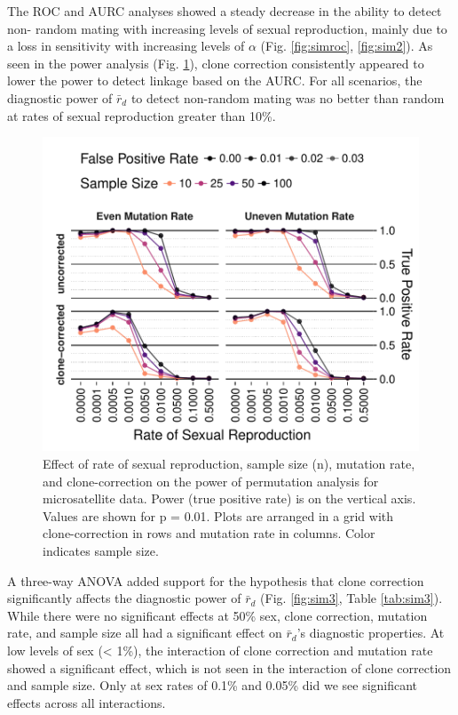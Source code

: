 \documentclass[]{article}
\theoremstyle{definition}
\theoremstyle{definition}
\theoremstyle{definition}
\theoremstyle{remark}
\begin{document}
The ROC and AURC analyses showed a steady decrease in the ability to
detect non- random mating with increasing levels of sexual reproduction,
mainly due to a loss in sensitivity with increasing levels of \(\alpha\)
(Fig. \ref{fig:simroc}, \ref{fig:sim2}). As seen in the power analysis
(Fig. \ref{fig:sim4}), clone correction consistently appeared to lower
the power to detect linkage based on the AURC. For all scenarios, the
diagnostic power of \(\bar{r}_d\) to detect non-random mating was no
better than random at rates of sexual reproduction greater than 10\%.

\begin{figure}
\centering
\includegraphics[width=1.00000\textwidth]{figure/ssr_power.pdf}
\caption{Effect of rate of sexual reproduction, sample size (n),
mutation rate, and clone-correction on the power of permutation analysis
for microsatellite data. Power (true positive rate) is on the vertical
axis. Values are shown for p = 0.01. Plots are arranged in a grid with
clone-correction in rows and mutation rate in columns. Color indicates
sample size.}\label{fig:sim4}
\end{figure}

A three-way ANOVA added support for the hypothesis that clone correction
significantly affects the diagnostic power of \(\bar{r}_d\) (Fig.
\ref{fig:sim3}, Table \ref{tab:sim3}). While there were no significant
effects at 50\% sex, clone correction, mutation rate, and sample size
all had a significant effect on \(\bar{r}_d\)'s diagnostic properties.
At low levels of sex (\textless{} 1\%), the interaction of clone
correction and mutation rate showed a significant effect, which is not
seen in the interaction of clone correction and sample size. Only at sex
rates of 0.1\% and 0.05\% did we see significant effects across all
interactions.
\end{document}
